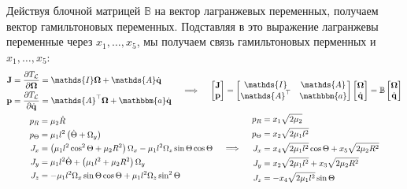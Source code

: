 \documentclass[12pt]{article}
\newcommand{\lb}{\left(}
\newcommand{\rb}{\right)}
\newcommand{\mL}{\mathcal{L}}
\newcommand{\bbB}{\mathbb{B}}
\newcommand{\mf}{\mathbf}
\newcommand{\dR}{\dot{R}}
\newcommand{\dT}{\dot{\Theta}}
\newcommand{\pT}{p_\Theta}
\newcommand{\bbI}{\mathds{I}}
\newcommand{\bba}{\mathbbm{a}}
\newcommand{\bbA}{\mathds{A}}
\begin{document}
Действуя блочной матрицей $\bbB$ на вектор лагранжевых переменных, получаем вектор гамильтоновых переменных. Подставляя в это выражение лагранжевы переменные через $x_1, \dots, x_5$, мы получаем связь гамильтоновых перменных и $x_1, \dots, x_5$:
\begin{gather}
	\begin{aligned}
	\mf{J} &= \frac{\partial T_\mL}{\partial \mf{\Omega}} = \bbI \mf{\Omega} + \bbA \dot{\mf{q}} \\
		\mf{p} &= \frac{\partial T_\mL}{\partial \dot{\mf{q}}} = \bbA^\top \mf{\Omega} + \bba \dot{\mf{q}}
	\end{aligned}
	\quad \implies \quad
	\begin{bmatrix}
		\mf{J} \\
		\mf{p}
	\end{bmatrix} =
	\begin{bmatrix}
		\bbI & \bbA \\
		\bbA^\top & \bba
	\end{bmatrix}
	\begin{bmatrix}
		\mf{\Omega} \\
		\dot{\mf{q}}
	\end{bmatrix} =
	\bbB
	\begin{bmatrix}
		\mf{\Omega} \\
		\dot{\mf{q}}
	\end{bmatrix} \\
	\begin{aligned}
		p_R &= \mu_2 \dR \\
		\pT &= \mu_1 l^ 2\lb \dT + \Omega_y \rb \\
		J_x &= \lb \mu_1 l^2 \cos^2 \Theta + \mu_2 R^2 \rb \Omega_x - \mu_1 l^2 \Omega_z \sin \Theta \cos \Theta \\
		J_y &= \mu_1 l^2 \dT + \lb \mu_1 l^2 + \mu_2 R^2 \rb \Omega_y \\
		J_z &= - \mu_1 l^2 \Omega_x \sin \Theta \cos \Theta + \mu_1 l^2 \Omega_z \sin^2 \Theta 
	\end{aligned} 
	\quad \implies \quad 
	\begin{aligned}
		p_R &= x_1 \sqrt{2 \mu_2} \\
		\pT &= x_2 \sqrt{2 \mu_1 l^2} \\
		J_x &= x_4 \sqrt{2 \mu_1 l^2} \cos \Theta + x_5 \sqrt{2 \mu_2 R^2} \\
		J_y &= x_2 \sqrt{2 \mu_1 l^2} + x_3 \sqrt{2 \mu_2 R^2} \\
		J_z &= - x_4 \sqrt{2 \mu_1 l^2} \sin \Theta
\end{aligned} \label{co2ar2}
\end{gather}
\end{document}
